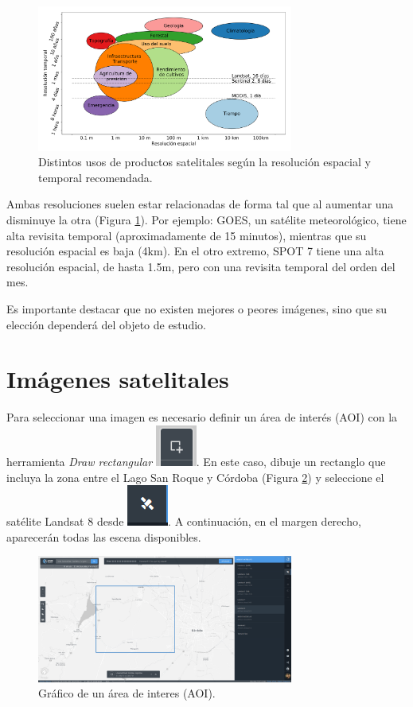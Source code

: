 \documentclass[a4paper,12pt]{book}
\begin{document}
\begin{figure}[h!]
    \centering
    \includegraphics[width=0.75\textwidth]{fig:evst.png}
    \caption{Distintos usos de productos satelitales según la resolución espacial y temporal recomendada.}
    \label{fig:evst}
\end{figure}

Ambas resoluciones suelen estar relacionadas de forma  tal que al aumentar una disminuye la otra (Figura \ref{fig:evst}). Por ejemplo: GOES, un satélite meteorológico, tiene alta revisita temporal (aproximadamente de 15 minutos), mientras que su resolución espacial es baja (4km). En el otro extremo, SPOT 7 tiene una alta resolución espacial, de hasta 1.5m, pero con una revisita temporal del orden del mes.

Es importante destacar que no existen mejores o peores imágenes, sino que su elección dependerá del objeto de estudio.

\section{Imágenes satelitales}
Para seleccionar una imagen es necesario definir un área de interés (AOI) con la herramienta \emph{Draw rectangular} \includegraphics[scale=0.2]{in:draw.png}.
En este caso, dibuje un rectanglo que incluya la zona entre el Lago San Roque y Córdoba (Figura \ref{fig:aoi}) y seleccione el satélite Landsat 8 desde \includegraphics[scale=0.2]{in:sat.png}. A continuación, en el margen derecho, aparecerán todas las escena disponibles.

\begin{figure}[h!]
    \centering
    \includegraphics[width=0.75\textwidth]{fig:aoi.png}
    \caption{Gráfico de un área de interes (AOI).}
    \label{fig:aoi}
\end{figure}
\end{document}
